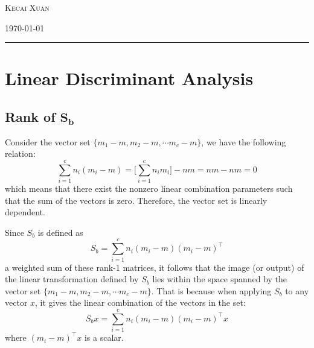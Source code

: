 \documentclass[12pt]{article}
\newcommand{\0}{\boldsymbol{0}}
\begin{document}
\begin{titlepage}
    \vspace{0.013\textheight}

    {\large \textsc{Kecai Xuan}}

    \vspace{0.013\textheight}






    \vspace{0.04\textheight}


    \vfill  %

    {\large \today}  %
    \vspace{0.04\textheight}  %


    \rule{\textwidth}{1pt}  %

\end{titlepage}

\section{Linear Discriminant Analysis}

\subsection{Rank of $\mathbf{S_b}$}

Consider the vector set $\{m_1 - m, m_2 - m,\cdots m_c-m\}$, we have the following relation:
\[
    \sum_{i=1}^c n_i\left(m_i-m\right)=\bigg[\sum_{i=1}^c n_i m_i\bigg]-n m=n m-n m=0
\]
which means that there exist the nonzero linear combination parameters such that the sum of the vectors is zero. Therefore, the vector set is linearly dependent.

Since $S_b$ is defined as
\[
    \displaystyle S_b=\sum_{i=1}^c n_i\left(m_i-m\right)\left(m_i-m\right)^\top
\]
a weighted sum of these rank-1 matrices, it follows that the image (or output) of the linear transformation defined by $S_b$ lies within the space spanned by the vector set $\{m_1 - m, m_2 - m,\cdots m_c-m\}$. That is because when applying $S_b$ to any vector $x$, it gives the linear combination of the vectors in the set:
\[
    S_b x = \sum_{i=1}^c n_i\left(m_i-m\right)\left(m_i-m\right)^\top x
\]
where $\left(m_i-m\right)^\top x$ is a scalar. 
\end{document}
